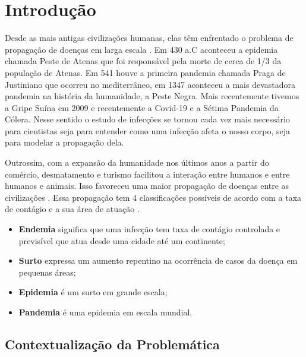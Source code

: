 \chapter{Introdução}
Desde as mais antigas civilizações humanas, elas têm enfrentado o problema de propagação de doenças em larga escala \cite{historic}. Em 430 a.C aconteceu a epidemia chamada Peste de Atenas que foi responsável pela morte de cerca de 1/3 da população de Atenas. Em 541 houve a primeira pandemia chamada Praga de Justiniano que ocorreu no mediterrâneo, em 1347 aconteceu a mais devastadora pandemia na história da humanidade, a Peste Negra. Mais recentemente tivemos a Gripe Suína em 2009 e recentemente a Covid-19 e a Sétima Pandemia da Cólera. Nesse sentido o estudo de infecções se tornou cada vez mais necessário para cientistas seja para entender como uma infecção afeta o nosso corpo, seja para modelar a propagação dela.

Outrossim, com a expansão da humanidade nos últimos anos a partir do comércio, desmatamento e turismo facilitou a interação entre humanos e entre humanos e animais. Isso favoreceu uma maior propagação de doenças entre as civilizações \cite{area}. Essa propagação tem 4 classificações possíveis de acordo com a taxa de contágio e a sua área de atuação \cite{whats}.

\begin{itemize}
  \item \textbf{Endemia} significa que uma infecção tem taxa de contágio controlada e previsível que atua desde uma cidade até um continente;
  \item \textbf{Surto} expressa um aumento repentino na ocorrência de casos da doença em pequenas áreas;
  \item \textbf{Epidemia} é um surto em grande escala;
  \item \textbf{Pandemia} é uma epidemia em escala mundial.
\end{itemize}

\section{Contextualização da Problemática}